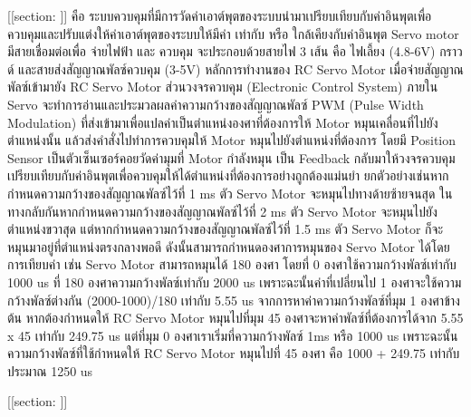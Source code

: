  [[section: ]]   
    คือ ระบบควบคุมที่มีการวัดค่าเอาต์พุตของระบบนำมาเปรียบเทียบกับค่าอินพุตเพื่อควบคุมและปรับแต่งให้ค่าเอาต์พุตของระบบให้มีค่า เท่ากับ หรือ ใกล้เคียงกับค่าอินพุต Servo motor 
    มีสายเชื่อมต่อเพื่อ จ่ายไฟฟ้า และ ควบคุม จะประกอบด้วยสายไฟ 3 เส้น คือ ไฟเลี้ยง (4.8-6V) กราวด์ และสายส่งสัญญาณพัลซ์ควบคุม (3-5V) 
    หลักการทำงานของ RC Servo Motor เมื่อจ่ายสัญญาณพัลซ์เข้ามายัง RC Servo Motor ส่วนวงจรควบคุม (Electronic Control System) ภายใน Servo 
    จะทำการอ่านและประมวลผลค่าความกว้างของสัญญาณพัลซ์ PWM (Pulse Width Modulation) ที่ส่งเข้ามาเพื่อแปลค่าเป็นตำแหน่งองศาที่ต้องการให้ Motor 
    หมุนเคลื่อนที่ไปยังตำแหน่งนั้น แล้วส่งคำสั่งไปทำการควบคุมให้ Motor หมุนไปยังตำแหน่งที่ต้องการ โดยมี Position Sensor เป็นตัวเซ็นเซอร์คอยวัดค่ามุมที่ Motor กำลังหมุน 
    เป็น Feedback กลับมาให้วงจรควบคุมเปรียบเทียบกับค่าอินพุตเพื่อควบคุมให้ได้ตำแหน่งที่ต้องการอย่างถูกต้องแม่นยำ
    ยกตัวอย่างเช่นหากกำหนดความกว้างของสัญญาณพัลซ์ไว้ที่ 1 ms ตัว Servo Motor จะหมุนไปทางด้ายซ้ายจนสุด ในทางกลับกันหากกำหนดความกว้างของสัญญาณพัลซ์ไว้ที่ 2 ms 
    ตัว Servo Motor จะหมุนไปยังตำแหน่งขวาสุด แต่หากกำหนดความกว้างของสัญญาณพัลซ์ไว้ที่ 1.5 ms ตัว Servo Motor ก็จะหมุนมาอยู่ที่ตำแหน่งตรงกลางพอดี ดังนั้นสามารถกำหนดองศาการหมุนของ Servo Motor ได้โดยการเทียบค่า 
    เช่น Servo Motor สามารถหมุนได้ 180 องศา โดยที่ 0 องศาใช้ความกว้างพัลซ์เท่ากับ 1000 us ที่ 180 องศาความกว้างพัลซ์เท่ากับ 2000 us เพราะฉะนั้นค่าที่เปลี่ยนไป 1 องศาจะใช้ความกว้างพัลซ์ต่างกัน (2000-1000)/180 เท่ากับ 5.55 us 
    จากการหาค่าความกว้างพัลซ์ที่มุม 1 องศาข้างต้น หากต้องกำหนดให้ RC Servo Motor หมุนไปที่มุม 45 องศาจะหาค่าพัลซ์ที่ต้องการได้จาก 5.55 x 45 เท่ากับ 249.75 us 
    แต่ที่มุม 0 องศาเราเริ่มที่ความกว้างพัลซ์ 1ms หรือ 1000 us เพราะฉะนั้นความกว้างพัลซ์ที่ใช้กำหนดให้ RC Servo Motor หมุนไปที่ 45 องศา คือ 1000 + 249.75 เท่ากับประมาณ 1250 us

[[section: ]]